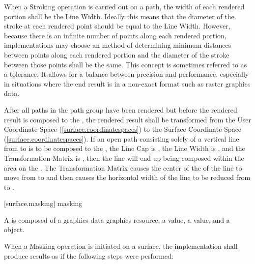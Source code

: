 \pnum
When a Stroking operation is carried out on a path, the width of each rendered portion shall be the Line Width. Ideally this means that the diameter of the stroke at each rendered point should be equal to the Line Width. However, because there is an infinite number of points along each rendered portion, implementations may choose an \unspecnorm method of determining minimum distances between points along each rendered portion and the diameter of the stroke between those points shall be the same.
\enternote
This concept is sometimes referred to as a tolerance. It allows for a balance between precision and performance, especially in situations where the end result is in a non-exact format such as raster graphics data.
\exitnote

\pnum
After all paths in the path group have been rendered but before the rendered result is composed to the \underlyingsurface, the rendered result shall be transformed from the User Coordinate Space (\ref{surface.coordinatespaces}) to the Surface Coordinate Space (\ref{surface.coordinatespaces}).
\enterexample
If an open path consisting solely of a vertical line from  to  is to be composed to the \underlyingsurface, the Line Cap is , the Line Width is , and the Transformation Matrix is , then the line will end up being composed within the area  on the \underlyingsurface. The Transformation Matrix causes the center of the \xaxis of the line to move from  to  and then causes the horizontal width of the line to be reduced from  to .
\exitexample

 [surface.masking] { masking}

\pnum
A  is composed of a graphics data graphics resource, a  value, a  value, and a  object.

\pnum
When a Masking operation is initiated on a surface, the implementation shall produce results as if the following steps were performed:

